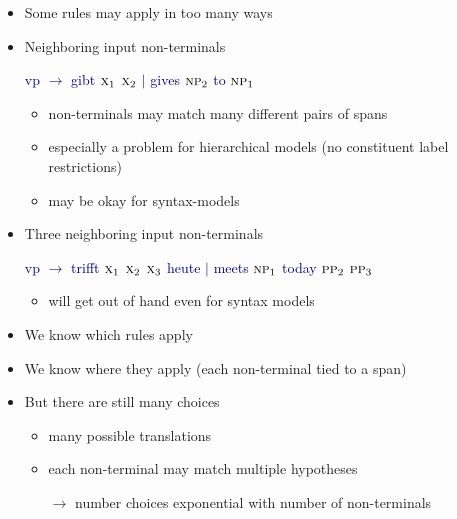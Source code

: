 \documentclass[landscape]{slides}
\newcommand{\example}[1]{\textcolor{darkblue}{\rm #1}}
\begin{document}
\begin{itemize}
\item Some rules may apply in too many ways
\item Neighboring input non-terminals
\begin{center}
\example{{\sc vp} $\rightarrow$ gibt $\text{\sc x}_1$ $\text{\sc x}_2$ $|$ gives $\text{\sc np}_2$ to $\text{\sc np}_1$}
\end{center}
\begin{itemize}
\item non-terminals may match many different pairs of spans
\item especially a problem for hierarchical models (no constituent label restrictions) 
\item may be okay for syntax-models
\end{itemize}
\item Three neighboring input non-terminals
\begin{center}
\example{{\sc vp} $\rightarrow$ trifft $\text{\sc x}_1$ $\text{\sc x}_2$  $\text{\sc x}_3$ heute $|$ meets $\text{\sc np}_1$ today $\text{\sc pp}_2$ $\text{\sc pp}_3$}
\end{center}
\begin{itemize}
\item will get out of hand even for syntax models
\end{itemize}

\end{itemize}


\vspace{20mm}
\begin{itemize}\itemsep 5mm
\item We know which rules apply
\item We know where they apply (each non-terminal tied to a span)
\item But there are still many choices
\begin{itemize}
\item many possible translations
\item each non-terminal may match multiple hypotheses
\item[$\rightarrow$] number choices exponential with number of non-terminals
\end{itemize}
\end{itemize}
\end{document}
